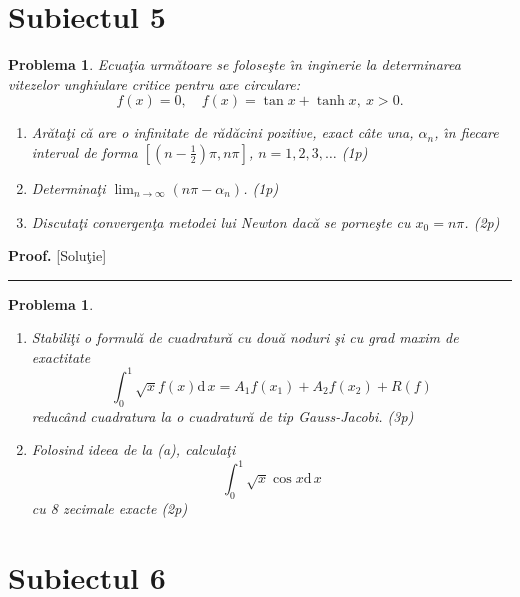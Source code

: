 \documentclass[12pt]{article}%
\newtheorem{problem}[theorem]{Problema}
\newenvironment{proof}[1][Proof]{\noindent\textbf{#1.} }{\ \rule{0.5em}{0.5em}}
\begin{document}
\section*{Subiectul 5}

\begin{problem}
\label{Gautschip4.31}Ecua\c{t}ia urm\u{a}toare se folose\c{s}te \^{\i}n
inginerie la determinarea vitezelor unghiulare critice pentru axe circulare:%
\[
f(x)=0,\quad f(x)=\tan x+\tanh x,~x>0.
\]


\begin{enumerate}
\item[(a)] Ar\u{a}ta\c{t}i c\u{a} are o infinitate de r\u{a}d\u{a}cini
pozitive, exact c\^{a}te una, $\alpha_{n}$, \^{\i}n fiecare interval de forma
$\left[  \left(  n-\frac{1}{2}\right)  \pi,n\pi\right]  $, $n=1,2,3,\dots$ (1p)

\item[(b)] Determina\c{t}i $\lim_{n\rightarrow\infty}\left(  n\pi-\alpha
_{n}\right)  $. (1p)

\item[(c)] Discuta\c{t}i convergen\c{t}a metodei lui Newton dac\u{a} se
porne\c{s}te cu $x_{0}=n\pi$. (2p)
\end{enumerate}
\end{problem}

\begin{proof}
[Solu\c{t}ie]
\end{proof}

\begin{problem}


\begin{enumerate}
\item[(a)] Stabili\c{t}i o formul\u{a} de cuadratur\u{a} cu dou\u{a} noduri
\c{s}i cu grad maxim de exactitate
\[
\int_{0}^{1}\sqrt{x}f(x)\mathrm{d}\,x=A_{1}f(x_{1})+A_{2}f(x_{2})+R(f)
\]
reduc\^{a}nd cuadratura la o cuadratur\u{a} de tip Gauss-Jacobi. (3p)

\item[(b)] Folosind ideea de la (a), calcula\c{t}i
\[
\int_{0}^{1}\sqrt{x}\cos x\mathrm{d}\,x
\]
cu 8 zecimale exacte (2p)
\end{enumerate}
\end{problem}

\section{Subiectul 6}
\end{document}
